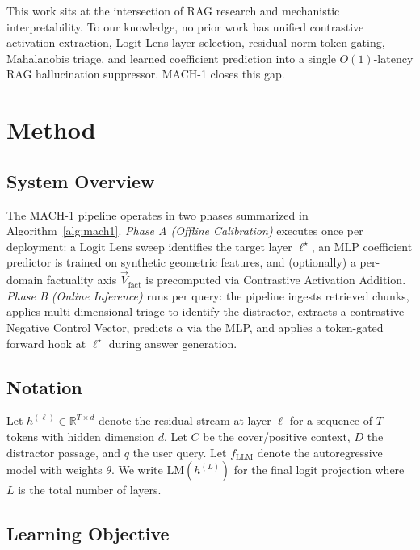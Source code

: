 \documentclass[conference]{IEEEtran}
\begin{document}
This work sits at the intersection of RAG research and mechanistic interpretability. To our knowledge, no prior work has unified contrastive activation extraction, Logit Lens layer selection, residual-norm token gating, Mahalanobis triage, and learned coefficient prediction into a single $O(1)$-latency RAG hallucination suppressor. MACH-1 closes this gap.

\section{Method}\label{sec:method}

\subsection{System Overview}

The MACH-1 pipeline operates in two phases summarized in Algorithm~\ref{alg:mach1}. \emph{Phase A (Offline Calibration)} executes once per deployment: a Logit Lens sweep identifies the target layer $\ell^\star$, an MLP coefficient predictor is trained on synthetic geometric features, and (optionally) a per-domain factuality axis $\vec{V}_{\text{fact}}$ is precomputed via Contrastive Activation Addition. \emph{Phase B (Online Inference)} runs per query: the pipeline ingests retrieved chunks, applies multi-dimensional triage to identify the distractor, extracts a contrastive Negative Control Vector, predicts $\alpha$ via the MLP, and applies a token-gated forward hook at $\ell^\star$ during answer generation.

\subsection{Notation}

Let $h^{(\ell)} \in \mathbb{R}^{T \times d}$ denote the residual stream at layer $\ell$ for a sequence of $T$ tokens with hidden dimension $d$. Let $C$ be the cover/positive context, $D$ the distractor passage, and $q$ the user query. Let $f_{\text{LLM}}$ denote the autoregressive model with weights $\theta$. We write $\text{LM}(h^{(L)})$ for the final logit projection where $L$ is the total number of layers.

\subsection{Learning Objective}
\end{document}

